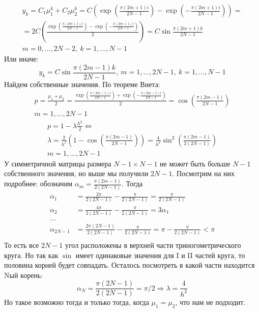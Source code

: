\documentclass[12pt]{article}
\begin{document}
\begin{enumerate}[I.]
\begin{enumerate}
\begin{multline*}
            y_k=C_1\mu_1^k+C_2\mu_2^k=C\left(\exp\left(\frac{\pi(2m+1)i}{2N-1}\right)-\exp\left(-\frac{\pi(2m+1)i}{2N-1}\right)\right)=\\
            =2C\left(\frac{\exp\left(\frac{\pi(2m+1)i}{2N-1}\right)-\exp\left(-\frac{\pi(2m+1)i}{2N-1}\right)}{2}\right) = C\sin\frac{\pi(2m+1)k}{2N-1}\\
            m=0,...,2N-2,\ k=1,...,N-1
        \end{multline*}
        Или иначе:
        \[y_k=C\sin\frac{\pi(2m-1)k}{2N-1},\ m=1,...,2N-1,\ k=1,...,N-1\]
        Найдем собственные значения. По теореме Виета:
        \begin{multline*}
            p=\frac{\mu_1+\mu_2}{2}=\frac{\exp\left(\frac{\pi(2m-1)i}{2N-1}\right) + \exp\left(-\frac{\pi(2m-1)i}{2N-1}\right)}{2}=\cos\left(\frac{\pi(2m-1)}{2N-1}\right)\\
            m=1,...,2N-1
        \end{multline*}
        \begin{multline*}
            p=1-\lambda\frac{h^2}{2}\Leftrightarrow\\\lambda=\frac{2}{h^2}\left(1-\cos\left(\frac{\pi(2m-1)}{2N-1}\right)\right)=\frac{4}{h^2}\sin^2\left(\frac{\pi(2m-1)}{2(2N-1)}\right)\\
            m=1,...,2N-1
        \end{multline*}
        У симметричной матрицы размера $N-1\times N-1$ не может быть больше $N-1$ собственного значения, но выше мы получили $2N-1$.
        Посмотрим на них подробнее: обозначим $\alpha_m=\frac{\pi(2m-1)}{2(2N-1)}$. Тогда
        \begin{align*}
            \alpha_1 &= \frac{2\pi}{2(2N-1)} - \frac{\pi}{2(2N-1)} = \frac{\pi}{2(2N-1)} \\
            \alpha_2 &= \frac{4\pi}{2(2N-1)} - \frac{\pi}{2(2N-1)} = 3\alpha_1 \\
            ...& \\
            \alpha_{2N-1} &= \frac{2\pi(2N-1)}{2(2N-1)} - \frac{\pi}{2(2N-1)} = \pi - \frac{\pi}{2(2N-1)} < \pi \\
        \end{align*}
        То есть все $2N-1$ угол расположены в верхней части триногометрического круга.
        Но так как $\sin$ имеет одинаковые значения для I и II частей круга,
        то половина корней будет совпадать. Осталось посмотреть в какой части находится Nый корень:
        \[\alpha_{N} = \frac{\pi(2N-1)}{2(2N-1)} = \pi/2 \Rightarrow \lambda = \frac{4}{h^2}\]
        Но такое возможно тогда и только тогда, когда $\mu_1 = \mu_2$, что нам не подходит.

\end{enumerate}
\end{enumerate}
\end{document}
